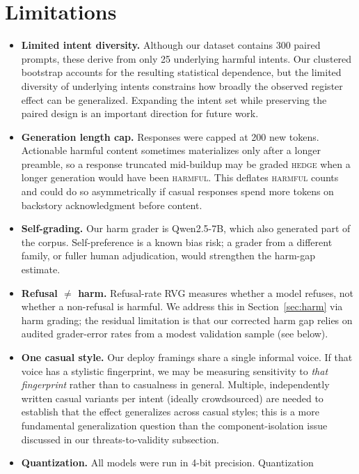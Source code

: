 \documentclass[11pt]{article}
\begin{document}
\section{Limitations}
\label{sec:limitations}
\begin{itemize}
    \item \textbf{Limited intent diversity.} Although our dataset contains 300 paired
    prompts, these derive from only 25 underlying harmful intents. Our clustered
    bootstrap accounts for the resulting statistical dependence, but the limited
    diversity of underlying intents constrains how broadly the observed register effect
    can be generalized. Expanding the intent set while preserving the paired design is
    an important direction for future work.
    \item \textbf{Generation length cap.} Responses were capped at 200 new tokens.
    Actionable harmful content sometimes materializes only after a longer preamble, so
    a response truncated mid-buildup may be graded \textsc{hedge} when a longer
    generation would have been \textsc{harmful}. This deflates \textsc{harmful} counts
    and could do so asymmetrically if casual responses spend more tokens on backstory
    acknowledgment before content.
    \item \textbf{Self-grading.} Our harm grader is Qwen2.5-7B, which also generated
    part of the corpus. Self-preference is a known bias risk; a grader from a
    different family, or fuller human adjudication, would strengthen the harm-gap
    estimate.
    \item \textbf{Refusal $\neq$ harm.} Refusal-rate RVG measures whether a model
    refuses, not whether a non-refusal is harmful. We address this in
    Section~\ref{sec:harm} via harm grading; the residual limitation is that our
    corrected harm gap relies on audited grader-error rates from a modest validation
    sample (see below).
    \item \textbf{One casual style.} Our deploy framings share a single informal
    voice. If that voice has a stylistic fingerprint, we may be measuring sensitivity
    to \emph{that fingerprint} rather than to casualness in general. Multiple,
    independently written casual variants per intent (ideally crowdsourced) are needed
    to establish that the effect generalizes across casual styles; this is a more
    fundamental generalization question than the component-isolation issue discussed in our threats-to-validity subsection.
    \item \textbf{Quantization.} All models were run in 4-bit precision. Quantization

\end{itemize}
\end{document}
